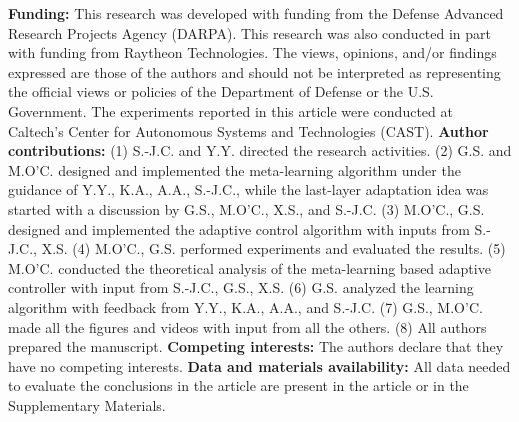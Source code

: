 \documentclass[11pt]{article}
\begin{document}
\textbf{Funding:} This research was developed with funding from the Defense Advanced Research Projects Agency (DARPA). This research was also conducted in part with funding from Raytheon Technologies.
The views, opinions, and/or findings expressed are those of the authors and
should not be interpreted as representing the official views or policies of
the Department of Defense or the U.S. Government. The experiments reported in this article were conducted at Caltech's Center for Autonomous Systems and Technologies (CAST). \textbf{Author contributions:} (1) S.-J.C. and Y.Y. directed the research activities. (2) G.S. and M.O'C. designed and implemented the meta-learning algorithm under the guidance of Y.Y., K.A., A.A., S.-J.C., while the last-layer adaptation idea was started with a discussion by G.S., M.O'C., X.S., and S.-J.C. (3) M.O'C., G.S. designed and implemented the adaptive control algorithm with inputs from S.-J.C., X.S. (4) M.O'C., G.S. performed experiments and evaluated the results. (5) M.O'C. conducted the theoretical analysis of the meta-learning based adaptive controller with input from S.-J.C., G.S., X.S. (6) G.S. analyzed the learning algorithm with feedback from Y.Y., K.A., A.A., and S.-J.C. (7) G.S., M.O'C. made all the figures and videos with input from all the others. (8) All authors prepared the manuscript. 
\textbf{Competing interests:} The authors
declare that they have no competing interests. \textbf{Data and materials availability:} All data needed to evaluate the conclusions in the article are present in the article or in the Supplementary Materials.


\end{document}
